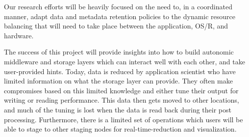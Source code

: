 \documentclass[11pt,letterpaper]{article}
\begin{document}
Our research efforts will be heavily focused on the need to, in a
coordinated manner, adapt data and metadata retention policies to the
dynamic resource balancing that will need to take place between the
application, OS/R, and hardware.

The success of this project will provide insights into how to build
autonomic middleware and storage layers which can interact well with each
other, and take user-provided hints. Today, data is reduced by application
scientist who have limited information on what the storage layer can
provide. They often make compromises based on this limited knowledge and
either tune their output for writing or reading performance. This data then
gets moved to other locations, and much of the tuning is lost when the data
is read back during their post processing. Furthermore, there is a limited
set of operations which users will be able to stage to other staging nodes
for real-time-reduction and visualization.


%  
\end{document}
